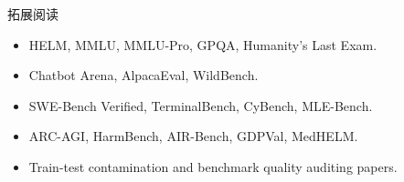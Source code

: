 \begin{knowledgebox}{拓展阅读}
\begin{itemize}
    \item HELM, MMLU, MMLU-Pro, GPQA, Humanity's Last Exam.
    \item Chatbot Arena, AlpacaEval, WildBench.
    \item SWE-Bench Verified, TerminalBench, CyBench, MLE-Bench.
    \item ARC-AGI, HarmBench, AIR-Bench, GDPVal, MedHELM.
    \item Train-test contamination and benchmark quality auditing papers.
\end{itemize}
\end{knowledgebox}


